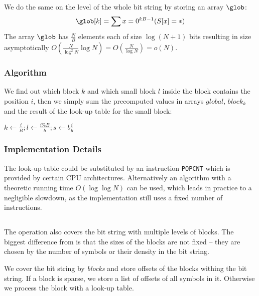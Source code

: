 We do the same on the level of the whole bit string by storing an array $\glob$:
$$ \glob[k] = \sum{x = 0}^{k B - 1} (S[x] = \ph) $$
The array $\glob$ has $\frac{N}{B}$ elements each of size $\log (N+1)$ bits resulting in size asymptotically $O(\frac{N}{\log^2 N} \log{N}) = O(\frac{N}{\log N}) = o(N)$.

\subsubsection{Algorithm}

We find out which block $k$ and which small block $l$ inside the block contains the position $i$, then we simply sum the precomputed values in arrays $global$, $block_k$ and the result of the look-up table for the small block:
\begin{algorithm}
\begin{algorithmic}
	\State $k \gets \frac{i}{B}; l \gets \frac{i \% B}{b}; s \gets b \frac{i}{b}$
	\State{}
\EndFunction
\end{algorithmic}
\end{algorithm}

\subsubsection{Implementation Details}

The look-up table could be substituted by an instruction \verb|POPCNT| which is provided by certain CPU architectures.
Alternatively an algorithm with a theoretic running time $O(\log \log N)$ can be used, which leads in practice to a negligible slowdown, as the implementation still uses a fixed number of instructions.

\subsection{\select}\label{ss:select}


The \select{} operation also covers the bit string with multiple levels of blocks.
The biggest difference from \rank{} is that the sizes of the blocks are not fixed -- they are chosen by the number of symbols \ph{} or their density in the bit string.

We cover the bit string by \emph{blocks} and store offsets of the blocks withing the bit string.
If a block is sparse, we store a list of offsets of all symbols \ph{} in it.
Otherwise we process the block with a look-up table.

